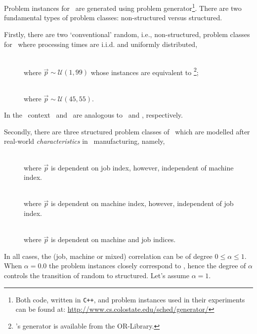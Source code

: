 \section{\Fsp}\label{sec:data:FSP}
Problem instances for \FSP\  are generated using \citet{Whitley} problem 
generator\footnote{Both code, written in \texttt{C++}, and problem instances 
used in their experiments can be found at: 
\url{http://www.cs.colostate.edu/sched/generator/}}. There are two fundamental 
types of problem classes: non-structured versus structured.

Firstly, there are two `conventional' random, i.e., non-structured, problem 
classes for \FSP\  where processing times are i.i.d. and uniformly distributed, 
\begin{description}
	\item[\Frnd]   \hfill \\
	where $\vec{p}\sim\mathcal{U}(1,99)$ whose instances are equivalent to \cite{Taillard1993}\footnote{\citeauthor{Taillard1993}'s generator is available from the OR-Library.};
	\item[\Frndn]   \hfill \\
	where $\vec{p}\sim\mathcal{U}(45,55)$.
\end{description}
In the \JSP\ context \ and \ are analogous to \ and , respectively.  

Secondly, there are three structured problem classes of \FSP\  which are modelled after real-world \emph{characteristics} in \fsp\ manufacturing, namely, 
\begin{description}
	\item[\Fjc]  \hfill \\
	where $\vec{p}$ is dependent on job index, however, independent of 
	machine index. 
	\item[\Fmc]   \hfill \\
	where $\vec{p}$ is dependent on machine index, however, independent of 
	job index. 
	\item[\Fmxc]   \hfill \\
	where $\vec{p}$ is dependent on machine and job indices. 
\end{description} 
In all cases, the (job, machine or mixed) correlation can be of degree 
$0\leq\alpha\leq1$. 
When $\alpha=0.0$ the problem instances closely correspond to , 
hence the degree of $\alpha$ controls the transition of random to structured. 
Let's assume $\alpha=1$.

